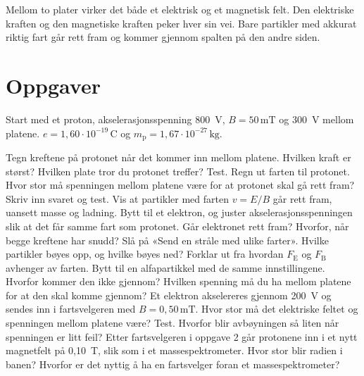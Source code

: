 \documentclass[11pt]{article}
\begin{document}

Mellom to plater virker det både et elektrisk og et magnetisk felt. Den elektriske kraften og den magnetiske kraften peker hver sin vei. Bare partikler med akkurat riktig fart går rett fram og kommer gjennom spalten på den andre siden.

\section*{Oppgaver}

Start med et proton, akselerasjonsspenning 800~V, $B = 50\,\mathrm{mT}$ og 300~V mellom platene. $e = 1{,}60 \cdot 10^{-19}\,\mathrm{C}$ og $m_{\mathrm{p}} = 1{,}67 \cdot 10^{-27}\,\mathrm{kg}$.

\begin{oppgaveliste}
\oppgave {}Tegn kreftene på protonet når det kommer inn mellom platene. Hvilken kraft er størst? Hvilken plate tror du protonet treffer? Test.
\svar
\oppgave {}Regn ut farten til protonet. Hvor stor må spenningen mellom platene være for at protonet skal gå rett fram? Skriv inn svaret og test.
\svar
\oppgave {}Vis at partikler med farten $v = E/B$ går rett fram, uansett masse og ladning. Bytt til et elektron, og juster akselerasjonsspenningen slik at det får samme fart som protonet. Går elektronet rett fram? Hvorfor, når begge kreftene har snudd?
\svar
\oppgave {}Slå på «Send en stråle med ulike farter». Hvilke partikler bøyes opp, og hvilke bøyes ned? Forklar ut fra hvordan $F_{\mathrm{E}}$ og $F_{\mathrm{B}}$ avhenger av farten.
\svar
\oppgave {}Bytt til en alfapartikkel med de samme innstillingene. Hvorfor kommer den ikke gjennom? Hvilken spenning må du ha mellom platene for at den skal komme gjennom?
\svar
\oppgave {}Et elektron akselereres gjennom 200~V og sendes inn i fartsvelgeren med $B = 0{,}50\,\mathrm{mT}$. Hvor stor må det elektriske feltet og spenningen mellom platene være? Test. Hvorfor blir avbøyningen så liten når spenningen er litt feil?
\svar
\oppgave {}Etter fartsvelgeren i oppgave 2 går protonene inn i et nytt magnetfelt på 0,10~T, slik som i et massespektrometer. Hvor stor blir radien i banen? Hvorfor er det nyttig å ha en fartsvelger foran et massespektrometer?
\svar
\end{oppgaveliste}
\end{document}
